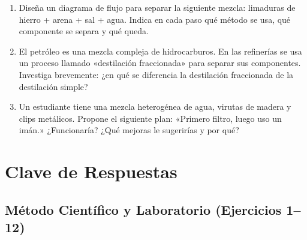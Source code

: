 \documentclass[12pt, letterpaper]{article}
\begin{document}
\begin{enumerate}[leftmargin=*, resume]
  \item \dificil{} Diseña un diagrama de flujo para separar la siguiente mezcla: limaduras de hierro + arena + sal + agua. Indica en cada paso qué método se usa, qué componente se separa y qué queda.

  \item \dificil{} El petróleo es una mezcla compleja de hidrocarburos. En las refinerías se usa un proceso llamado «destilación fraccionada» para separar sus componentes. Investiga brevemente: ¿en qué se diferencia la destilación fraccionada de la destilación simple?

  \item \dificil{} Un estudiante tiene una mezcla heterogénea de agua, virutas de madera y clips metálicos. Propone el siguiente plan: «Primero filtro, luego uso un imán.» ¿Funcionaría? ¿Qué mejoras le sugerirías y por qué?
\end{enumerate}

\newpage

\ifmwclaves
  \section{Clave de Respuestas}

  \subsection*{Método Científico y Laboratorio (Ejercicios 1--12)}
\end{document}
